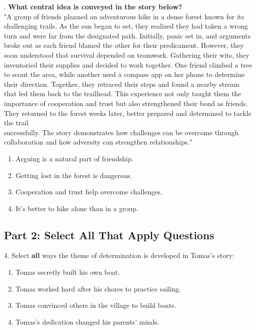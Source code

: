\documentclass[12pt]{article}
\begin{document}
\vspace{1cm}
. \textbf{What central idea is conveyed in the story below?\\}
"A group of friends planned an adventurous hike in a dense forest known for its challenging trails. As the sun began to set, they realized they had taken a wrong turn and were far from the designated path. Initially, panic set in, and arguments broke out as each friend blamed the other for their predicament. However, they soon understood that survival depended on teamwork. Gathering their wits, they inventoried their supplies and decided to work together. One friend climbed a tree to scout the area, while another used a compass app on her phone to determine their direction. Together, they retraced their steps and found a nearby stream that led them back to the trailhead. This experience not only taught them the importance of cooperation and trust but also strengthened their bond as friends. They returned to the forest weeks later, better prepared and determined to tackle the trail\\ successfully. The story demonstrates how challenges can be overcome through collaboration and how adversity can strengthen relationships."  
\begin{enumerate}[label=\Alph*.]
    \item Arguing is a natural part of friendship.  
    \item Getting lost in the forest is dangerous.  
    \item Cooperation and trust help overcome challenges.  
    \item It’s better to hike alone than in a group.  
\end{enumerate}



\subsection*{Part 2: Select All That Apply Questions}
\vspace{1em}
4. Select \textbf{all} ways the theme of determination is developed in Tomas’s story:  
\begin{enumerate}[label=\Alph*.]
    \item Tomas secretly built his own boat.  
    \item Tomas worked hard after his chores to practice sailing.  
    \item Tomas convinced others in the village to build boats.  
    \item Tomas’s dedication changed his parents’ minds.  
\end{enumerate}
\end{document}
